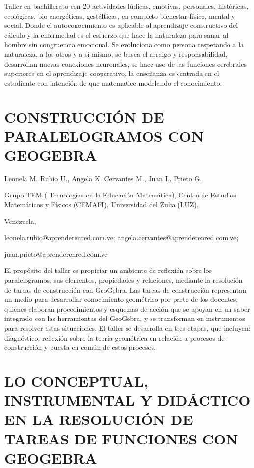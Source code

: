 Taller en bachillerato con 20 actividades lúdicas, emotivas, personales,
históricas, ecológicas, bio-energéticas, gestálticas, en completo
bienestar físico, mental y social. Donde el autoconocimiento es aplicable
al aprendizaje constructivo del cálculo y la enfermedad es el esfuerzo
que hace la naturaleza para sanar al hombre sin congruencia emocional.
Se evoluciona como persona respetando a la naturaleza, a los otros
y a sí mismo, se busca el arraigo y responsabilidad, desarrollan nuevas
conexiones neuronales, se hace uso de las funciones cerebrales superiores
en el aprendizaje cooperativo, la enseñanza es centrada en el estudiante
con intención de que matematice modelando el conocimiento. 


\section{CONSTRUCCIÓN DE PARALELOGRAMOS CON GEOGEBRA}

\begin{datos}

Leonela M. Rubio U., Angela K. Cervantes M., Juan L. Prieto G.

Grupo TEM ( Tecnologías en la Educación Matemática), Centro de Estudios
Matemáticos y Físicos (CEMAFI), Universidad del Zulia (LUZ),

Venezuela,

leonela.rubio@aprenderenred.com.ve; angela.cervantes@aprenderenred.com.ve;

juan.prieto@aprenderenred.com.ve 

\end{datos}

El propósito del taller es propiciar un ambiente de reflexión sobre
los paralelogramos, sus elementos, propiedades y relaciones, mediante
la resolución de tareas de construcción con GeoGebra. Las tareas de
construcción representan un medio para desarrollar conocimiento geométrico
por parte de los docentes, quienes elaboran procedimientos y esquemas
de acción que se apoyan en un saber integrado con las herramientas
del GeoGebra, y se transforman en instrumentos para resolver estas
situaciones. El taller se desarrolla en tres etapas, que incluyen:
diagnóstico, reflexión sobre la teoría geométrica en relación a procesos
de construcción y puesta en común de estos procesos. 


\section{LO CONCEPTUAL, INSTRUMENTAL Y DIDÁCTICO EN LA RESOLUCIÓN DE TAREAS
DE FUNCIONES CON GEOGEBRA }


